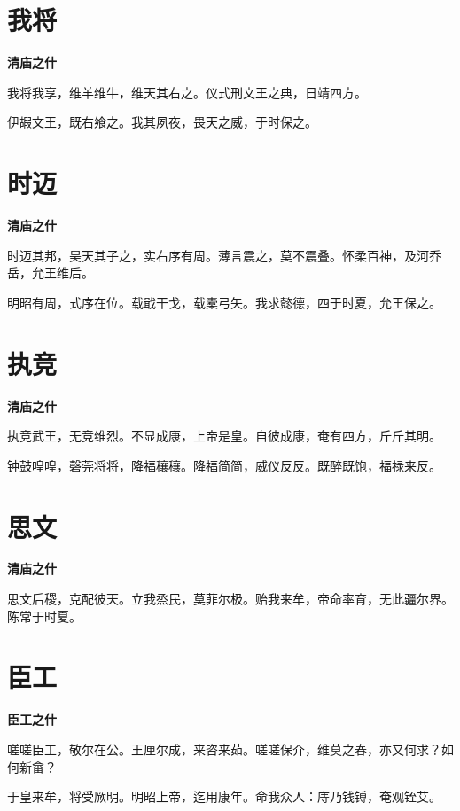 \documentclass[12pt,a4paper]{ctexbook}
\begin{document}
\section{我将}
\textbf{清庙之什}\par\vspace{0.5em}
我将我享，维羊维牛，维天其右之。仪式刑文王之典，日靖四方。\par
伊嘏文王，既右飨之。我其夙夜，畏天之威，于时保之。\par

\section{时迈}
\textbf{清庙之什}\par\vspace{0.5em}
时迈其邦，昊天其子之，实右序有周。薄言震之，莫不震叠。怀柔百神，及河乔岳，允王维后。\par
明昭有周，式序在位。载戢干戈，载橐弓矢。我求懿德，四于时夏，允王保之。\par

\section{执竞}
\textbf{清庙之什}\par\vspace{0.5em}
执竞武王，无竞维烈。不显成康，上帝是皇。自彼成康，奄有四方，斤斤其明。\par
钟鼓喤喤，磬莞将将，降福穰穰。降福简简，威仪反反。既醉既饱，福禄来反。\par

\section{思文}
\textbf{清庙之什}\par\vspace{0.5em}
思文后稷，克配彼天。立我烝民，莫菲尔极。贻我来牟，帝命率育，无此疆尔界。陈常于时夏。\par

\section{臣工}
\textbf{臣工之什}\par\vspace{0.5em}
嗟嗟臣工，敬尔在公。王厘尔成，来咨来茹。嗟嗟保介，维莫之春，亦又何求？如何新畲？\par
于皇来牟，将受厥明。明昭上帝，迄用康年。命我众人：庤乃钱镈，奄观铚艾。\par
\end{document}
